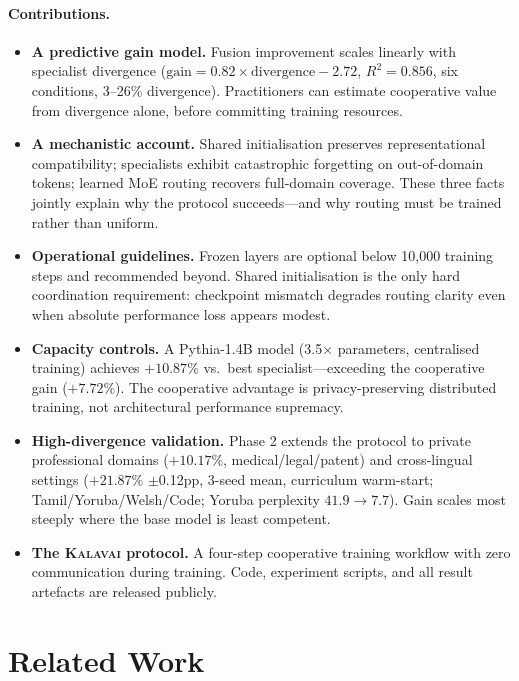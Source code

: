 \documentclass{article}
\newcommand{\kalavai}{\textsc{Kalavai}\xspace}
\begin{document}
\paragraph{Contributions.}
\begin{itemize}[leftmargin=*, itemsep=2pt]
  \item \textbf{A predictive gain model.} Fusion improvement scales linearly with specialist divergence ($\text{gain} = 0.82 \times \text{divergence} - 2.72$, $R^2 = 0.856$, six conditions, 3--26\% divergence). Practitioners can estimate cooperative value from divergence alone, before committing training resources.
  \item \textbf{A mechanistic account.} Shared initialisation preserves representational compatibility; specialists exhibit catastrophic forgetting on out-of-domain tokens; learned MoE routing recovers full-domain coverage. These three facts jointly explain why the protocol succeeds---and why routing must be trained rather than uniform.
  \item \textbf{Operational guidelines.} Frozen layers are optional below 10,000 training steps and recommended beyond. Shared initialisation is the only hard coordination requirement: checkpoint mismatch degrades routing clarity even when absolute performance loss appears modest.
  \item \textbf{Capacity controls.} A Pythia-1.4B model (3.5$\times$ parameters, centralised training) achieves $+10.87\%$ vs.\ best specialist---exceeding the cooperative gain ($+7.72\%$). The cooperative advantage is privacy-preserving distributed training, not architectural performance supremacy.
  \item \textbf{High-divergence validation.} Phase 2 extends the protocol to private professional domains ($+10.17\%$, medical/legal/patent) and cross-lingual settings ($+21.87\%$ $\pm$0.12pp, 3-seed mean, curriculum warm-start; Tamil/Yoruba/Welsh/Code; Yoruba perplexity $41.9\to7.7$). Gain scales most steeply where the base model is least competent.
  \item \textbf{The \kalavai protocol.} A four-step cooperative training workflow with zero communication during training. Code, experiment scripts, and all result artefacts are released publicly.
\end{itemize}

\section{Related Work}
\label{sec:related}
\end{document}
